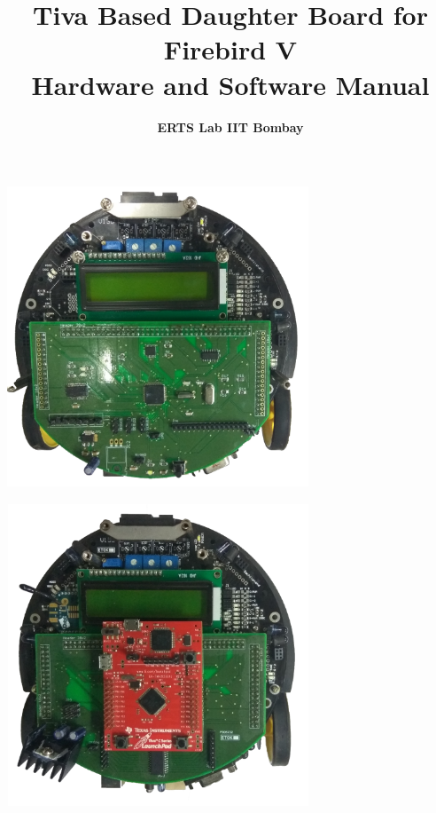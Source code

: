 \documentclass[a4paper,10pt,oneside]{article}
\title{{\textbf{Tiva Based Daughter Board for Firebird V \\ Hardware and Software Manual}}}
\author{\textbf{ ERTS Lab IIT Bombay}}
\begin{document}
	\maketitle
		\begin{center}
			\includegraphics[width=9cm, height=9cm]{Images/uC_DB} \\
		\end{center}
		
		\begin{center}
			\includegraphics[width=9cm, height=9cm]{Images/Plug_Play_DB}
		\end{center}
	
	\newpage
\end{document}
